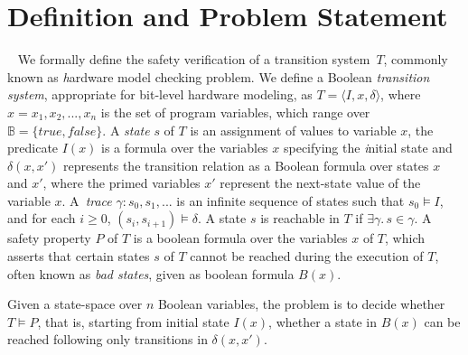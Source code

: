 \section{Definition and Problem Statement}~\label{problem}
%
We formally define the safety verification of a transition system~$T$,
commonly known as {\emph hardware model checking problem}.  We define a
Boolean \textit{transition system}, appropriate for bit-level hardware
modeling, as $T = \langle I,x,\delta \rangle$, where $x = x_1,x_2,...,x_n$
is the set of program variables, which range over $\mathbb{B} =
\{\mathit{true}, \mathit{false}\}$.  A \emph{state} $s$ of $T$ is an
assignment of values to variable $x$, the predicate $I(x)$ is a formula over
the variables $x$ specifying the {\emph initial state} and $\delta(x,x')$
represents the transition relation as a Boolean formula over states $x$ and
$x'$, where the primed variables $x'$ represent the next-state value of the
variable $x$.  A~\emph{trace} $\gamma: s_0,s_1,...$ is an infinite sequence
of states such that $s_0 \models I$, and for each $i \geq 0$, $(s_i,s_{i+1})
\models \delta$.  A state $s$ is reachable in $T$ if $\exists \gamma.\, s
\in \gamma$.  A safety property $P$ of $T$ is a boolean formula over the
variables $x$ of $T$, which asserts that certain states $s$ of $T$ cannot be
reached during the execution of $T$, often known as \emph{bad states}, given
as boolean formula $B(x)$.

Given a state-space over $n$ Boolean variables, the problem is to
decide whether $T \models P$, that is, starting from initial state
$I(x)$, whether a state in $B(x)$ can be reached following only
transitions in $\delta(x,x')$.
%
